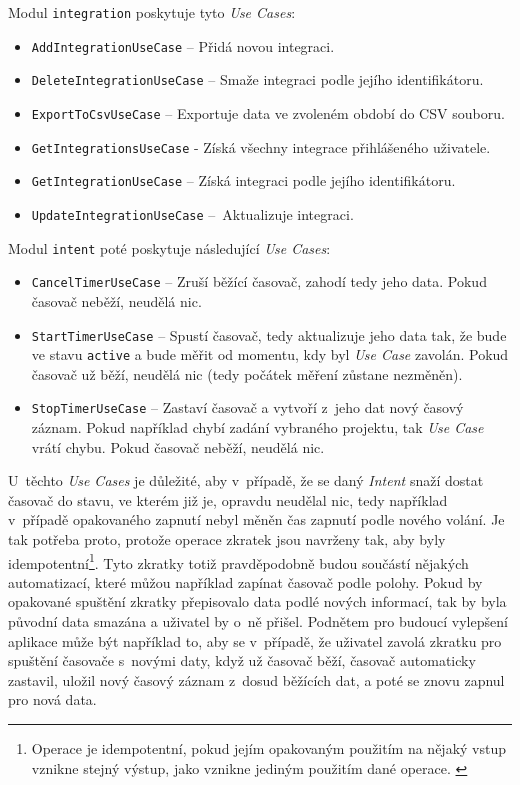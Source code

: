 Modul \texttt{integration} poskytuje tyto \emph{Use Cases}:
\begin{itemize}
\item\texttt{AddIntegrationUseCase} – Přidá novou integraci.
\item\texttt{DeleteIntegrationUseCase} – Smaže integraci podle jejího identifikátoru.
\item\texttt{ExportToCsvUseCase} – Exportuje data ve zvoleném období do CSV souboru.
\item\texttt{GetIntegrationsUseCase} - Získá všechny integrace přihlášeného uživatele.
\item\texttt{GetIntegrationUseCase} – Získá integraci podle jejího identifikátoru.
\item\texttt{UpdateIntegrationUseCase} – Aktualizuje integraci.
\end{itemize}
Modul \texttt{intent} poté poskytuje následující \emph{Use Cases}:
\begin{itemize}
\item\texttt{CancelTimerUseCase} – Zruší běžící časovač, zahodí tedy jeho data. Pokud časovač neběží, neudělá nic.
\item\texttt{StartTimerUseCase} – Spustí časovač, tedy aktualizuje jeho data tak, že bude ve stavu \texttt{active} a bude měřit od momentu, kdy byl \emph{Use Case} zavolán. Pokud časovač už běží, neudělá nic (tedy počátek měření zůstane nezměněn).
\item\texttt{StopTimerUseCase} – Zastaví časovač a vytvoří z~jeho dat nový časový záznam. Pokud například chybí zadání vybraného projektu, tak \emph{Use Case} vrátí chybu. Pokud časovač neběží, neudělá nic.
\end{itemize}
U~těchto \emph{Use Cases} je důležité, aby v~případě, že se daný \emph{Intent} snaží dostat časovač do stavu, ve kterém již je, opravdu neudělal nic, tedy například v~případě opakovaného zapnutí nebyl měněn čas zapnutí podle nového volání. Je tak potřeba proto, protože operace zkratek jsou navrženy tak, aby byly idempotentní\footnote{Operace je idempotentní, pokud jejím opakovaným použitím na nějaký vstup vznikne stejný výstup, jako vznikne jediným použitím dané operace. \cite{idempotence}}. Tyto zkratky totiž pravděpodobně budou součástí nějakých automatizací, které můžou například zapínat časovač podle polohy. Pokud by opakované spuštění zkratky přepisovalo data podlé nových informací, tak by byla původní data smazána a uživatel by o~ně přišel. Podnětem pro budoucí vylepšení aplikace může být například to, aby se v~případě, že uživatel zavolá zkratku pro spuštění časovače s~novými daty, když už časovač běží, časovač automaticky zastavil, uložil nový časový záznam z~dosud běžících dat, a poté se znovu zapnul pro nová data.

